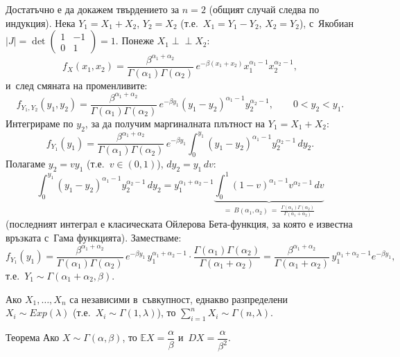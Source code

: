 \begin{proofbox}
Достатъчно е да докажем твърдението за $n=2$ (общият случай следва
по индукция). Нека $Y_1=X_1+X_2$, $Y_2=X_2$ (т.е.\ $X_1=Y_1-Y_2$,
$X_2=Y_2$), с~Якобиан $|J|=\det\begin{pmatrix}1&-1\\0&1\end{pmatrix}=1$.
Понеже $X_1\perp\!\!\!\perp X_2$:
\[
  f_X(x_1,x_2) = \frac{\beta^{\alpha_1+\alpha_2}}{\Gamma(\alpha_1)\Gamma(\alpha_2)}\,e^{-\beta(x_1+x_2)}x_1^{\alpha_1-1}x_2^{\alpha_2-1},
\]
и~след смяната на променливите:
\[
  f_{Y_1,Y_2}(y_1,y_2) = \frac{\beta^{\alpha_1+\alpha_2}}{\Gamma(\alpha_1)\Gamma(\alpha_2)}\,e^{-\beta y_1}(y_1-y_2)^{\alpha_1-1}y_2^{\alpha_2-1}, \qquad 0<y_2<y_1.
\]
Интегрираме по $y_2$, за да получим маргиналната плътност на
$Y_1=X_1+X_2$:
\[
  f_{Y_1}(y_1) = \frac{\beta^{\alpha_1+\alpha_2}}{\Gamma(\alpha_1)\Gamma(\alpha_2)}\,e^{-\beta y_1}\int_0^{y_1}(y_1-y_2)^{\alpha_1-1}y_2^{\alpha_2-1}\,dy_2.
\]
Полагаме $y_2=vy_1$ (т.е.\ $v\in(0,1)$), $dy_2=y_1\,dv$:
\[
  \int_0^{y_1}(y_1-y_2)^{\alpha_1-1}y_2^{\alpha_2-1}\,dy_2 = y_1^{\alpha_1+\alpha_2-1}\underbrace{\int_0^1 (1-v)^{\alpha_1-1}v^{\alpha_2-1}\,dv}_{=\ B(\alpha_1,\alpha_2)\ =\ \frac{\Gamma(\alpha_1)\Gamma(\alpha_2)}{\Gamma(\alpha_1+\alpha_2)}}
\]
(последният интеграл е класическата Ойлерова Бета-функция, за която
е известна връзката с~Гама функцията). Заместваме:
\[
  f_{Y_1}(y_1) = \frac{\beta^{\alpha_1+\alpha_2}}{\Gamma(\alpha_1)\Gamma(\alpha_2)}\,e^{-\beta y_1}\,y_1^{\alpha_1+\alpha_2-1}\cdot\frac{\Gamma(\alpha_1)\Gamma(\alpha_2)}{\Gamma(\alpha_1+\alpha_2)} = \frac{\beta^{\alpha_1+\alpha_2}}{\Gamma(\alpha_1+\alpha_2)}\,y_1^{\alpha_1+\alpha_2-1}e^{-\beta y_1},
\]
т.е.\ $Y_1\sim\Gamma(\alpha_1+\alpha_2,\beta)$. \qedbg
\end{proofbox}

\begin{corbox}[]
Ако $X_1,\dots,X_n$ са независими в~съвкупност, еднакво разпределени
$X_i\sim Exp(\lambda)$ (т.е.\ $X_i\sim\Gamma(1,\lambda)$), то
$\sum_{i=1}^n X_i \sim \Gamma(n,\lambda)$.
\end{corbox}

\begin{thmbox}[]{Теорема}
Ако $X\sim\Gamma(\alpha,\beta)$, то $\mathbb EX=\dfrac\alpha\beta$ и~$DX=\dfrac\alpha{\beta^2}$.
\end{thmbox}

